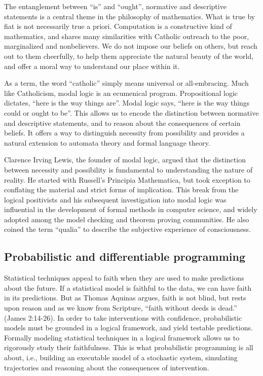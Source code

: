 \documentclass[sigplan,nonacm]{acmart}\settopmatter{printfolios=false,printccs=false,printacmref=false}
\begin{document}
The entanglement between ``is'' and ``ought'', normative and descriptive statements is a central theme in the philosophy of mathematics. What is true by fiat is not necessarily true a priori. Computation is a constructive kind of mathematics, and shares many similarities with Catholic outreach to the poor, marginalized and nonbelievers. We do not impose our beliefs on others, but reach out to them cheerfully, to help them appreciate the natural beauty of the world, and offer a moral way to understand our place within it.

As a term, the word ``catholic'' simply means universal or all-embracing. Much like Catholicism, modal logic is an ecumenical program. Propositional logic dictates, ``here is the way things are''. Modal logic says, ``here is the way things could or ought to be''. This allows us to encode the distinction between normative and descriptive statements, and to reason about the consequences of certain beliefs. It offers a way to distinguish necessity from possibility and provides a natural extension to automata theory and formal language theory.

Clarence Irving Lewis, the founder of modal logic, argued that the distinction between necessity and possibility is fundamental to understanding the nature of reality. He started with Russell's Principia Mathematica, but took exception to conflating the material and strict forms of implication. This break from the logical positivists and his subsequent investigation into modal logic was influential in the development of formal methods in computer science, and widely adopted among the model checking and theorem proving communities. He also coined the term ``qualia'' to describe the subjective experience of consciousness.

\subsection{Probabilistic and differentiable programming}

Statistical techniques appeal to faith when they are used to make predictions about the future. If a statistical model is faithful to the data, we can have faith in its predictions. But as Thomas Aquinas argues, faith is not blind, but rests upon reason and as we know from Scripture, ``faith without deeds is dead.'' (James 2:14-26). In order to take interventions with confidence, probabilistic models must be grounded in a logical framework, and yield testable predictions. Formally modeling statistical techniques in a logical framework allows us to rigorously study their faithfulness. This is what probabilistic programming is all about, i.e., building an executable model of a stochastic system, simulating trajectories and reasoning about the consequences of intervention.
\end{document}
